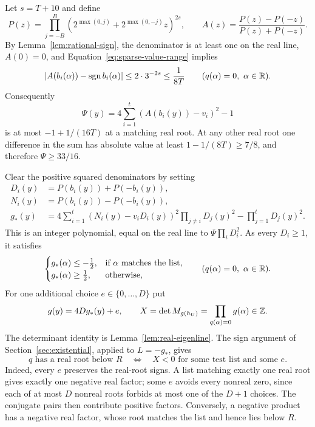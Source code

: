 Let $s=T+10$ and define
\begin{equation}\label{eq:sparse-approximant}
 P(z)=\prod_{j=-B}^{B}
 \left(2^{\max(0,j)}+2^{\max(0,-j)}z\right)^{2s},
 \qquad
 A(z)=\frac{P(z)-P(-z)}{P(z)+P(-z)}.
\end{equation}
By Lemma~\ref{lem:rational-sign}, the denominator is at least one
on the real line, $A(0)=0$, and Equation~\eqref{eq:sparse-value-range}
implies
\[
 |A(b_i(\alpha))-\operatorname{sgn} b_i(\alpha)|
 \le2\cdot3^{-2s}\le\frac1{8T}
 \qquad(q(\alpha)=0,\ \alpha\in\mathbb R).
\]
Consequently
\[
 \Psi(y)=4\sum_{i=1}^{t}(A(b_i(y))-v_i)^2-1
\]
is at most $-1+1/(16T)$ at a matching real root.  At any other
real root one difference in the sum has absolute value at least
$1-1/(8T)\ge7/8$, and therefore $\Psi\ge33/16$.

Clear the positive squared denominators by setting
\begin{align*}
 D_i(y)&=P(b_i(y))+P(-b_i(y)),\\
 N_i(y)&=P(b_i(y))-P(-b_i(y)),\\
 g_*(y)&=4\sum_{i=1}^{t}(N_i(y)-v_iD_i(y))^2
                 \prod_{j\ne i}D_j(y)^2
              -\prod_{j=1}^{t}D_j(y)^2.
\end{align*}
This is an integer polynomial, equal on the real line to
$\Psi\prod_iD_i^2$.  As every $D_i\ge1$, it satisfies
\begin{equation}\label{eq:sparse-sign-margin}
 \begin{cases}
  g_*(\alpha)\le-\tfrac12,&\text{if $\alpha$ matches the list},\\
  g_*(\alpha)\ge\tfrac12,&\text{otherwise},
 \end{cases}
 \qquad(q(\alpha)=0,\ \alpha\in\mathbb R).
\end{equation}
For one additional choice $e\in\{0,\ldots,D\}$ put
\begin{equation}\label{eq:sparse-product}
 g(y)=4Dg_*(y)+e,
 \qquad
 X=\det M_{g(h_U)}
   =\prod_{q(\alpha)=0}g(\alpha)\in\mathbb Z.
\end{equation}
The determinant identity is Lemma~\ref{lem:real-eigenline}.
The sign argument of Section~\ref{sec:existential}, applied to
$L=-g_*$, gives
\begin{equation}\label{eq:sparse-product-criterion}
 q\text{ has a real root below }R
 \quad\Longleftrightarrow\quad
 X<0\text{ for some test list and some }e.
\end{equation}
Indeed, every $e$ preserves the real-root signs.  A list matching
exactly one real root gives exactly one negative real factor;
some $e$ avoids every nonreal zero, since each of at most $D$
nonreal roots forbids at most one of the $D+1$ choices.
The conjugate pairs then contribute positive factors.
Conversely, a negative product has a negative real factor, whose
root matches the list and hence lies below $R$.

